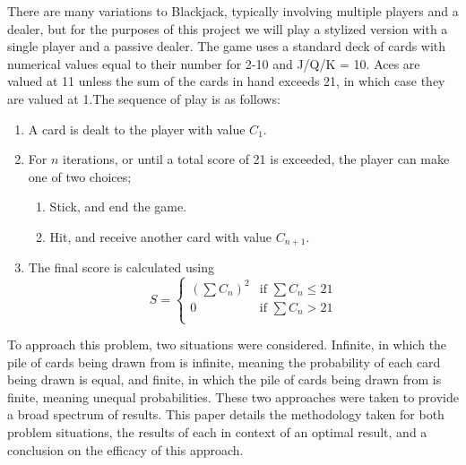 \medskip
There are many variations to Blackjack, typically involving multiple players and a dealer, but for the purposes of this project we will play a stylized version with a single player and a passive dealer. The game uses a standard deck of cards with numerical values equal to their number for 2-10 and J/Q/K = 10. Aces are valued at 11 unless the sum of the cards in hand exceeds 21, in which case they are valued at 1.The sequence of play is as follows:
\begin{enumerate}
    \item A card is dealt to the player with value \(C_1\).
    \item For \(n\) iterations, or until a total score of 21 is exceeded, the player can make one of two choices;
    \begin{enumerate} 
        \item Stick, and end the game.
        \item Hit, and receive another card with value \(C_{n+1}\).
    \end{enumerate}
    \item The final score is calculated using
        \begin{equation}
            S= 
            \begin{cases}
                (\sum C_n)^2 & \text{if } \sum C_n \le 21\\
                0            & \text{if } \sum C_n >   21\\
            \end{cases}
        \end{equation}
\end{enumerate}

\medskip
To approach this problem, two situations were considered. Infinite, in which the pile of cards being drawn from is infinite, meaning the probability of each card being drawn is equal, and finite, in which the pile of cards being drawn from is finite, meaning unequal probabilities. These two approaches were taken to provide a broad spectrum of results. This paper details the methodology taken for both problem situations, the results of each in context of an optimal result, and a conclusion on the efficacy of this approach.
